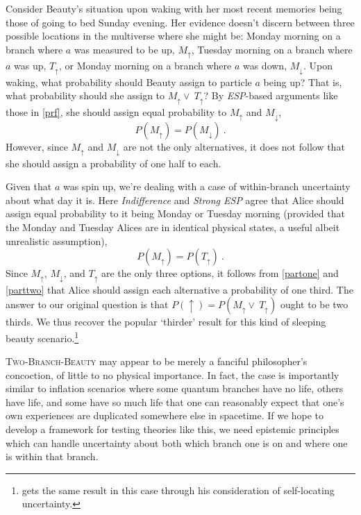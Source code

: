 \documentclass[12pt,onecolumn,secnumarabic,amsmath,amssymb,balancelastpage,nofootinbib]{article}
\begin{document}
Consider {Beauty's} situation upon waking with her most recent memories being those of going to bed Sunday evening. {Her} evidence doesn't discern between three possible locations in the multiverse where she might be: Monday morning on a branch where $a$ was measured to be up, $M_\uparrow $, Tuesday morning on a branch where $a$ was up, $T_\uparrow$, or Monday morning on a branch where $a$ was down, $M_\downarrow$.  Upon waking, what probability should Beauty assign to particle $a$ being up?  That is, what probability should she assign to $M_\uparrow \vee\: T_\uparrow$?  By \emph{ESP}-based arguments like those in \textsection \ref{prf}, she should assign equal probability to $M_\uparrow$ and $M_\downarrow$,
\begin{equation}
P\left(M_\uparrow\right)=P\left(M_\downarrow\right)\ .
\label{partone}
\end{equation}
However, since $M_\uparrow$ and $M_\downarrow$ are not the only alternatives, it does not follow that she should assign a probability of one half to each.

Given that $a$ was spin up, we're dealing with a case of within-branch uncertainty about what day it is.  Here \emph{Indifference} and \emph{Strong ESP} agree that Alice should assign equal probability to it being Monday or Tuesday morning (provided that the Monday and Tuesday Alices are in identical physical states, a useful albeit unrealistic assumption), 
\begin{equation}
P\left(M_\uparrow\right)=P\left(T_\uparrow\right)\ .
\label{parttwo}
\end{equation}
Since $M_\uparrow$, $M_\downarrow$, and $T_\uparrow$ are the only three options, it follows from \eqref{partone} and \eqref{parttwo} that Alice should assign each alternative a probability of one third.  The answer to our original question is that $P\left(\uparrow\right)=P\left(M_\uparrow \vee\: T_\uparrow\right)$ ought to be two thirds.  We thus recover the popular `thirder' result for this kind of sleeping beauty scenario.\footnote{\citet[]{vaidman2011} gets the same result in this case through his consideration of self-locating uncertainty.}

\textsc{Two-Branch-Beauty} may appear to be merely a fanciful philosopher's concoction, of little to no physical importance.  In fact, the case is importantly similar to inflation scenarios where some quantum branches have no life, others have life, and some have so much life that one can reasonably expect that one's own experiences are duplicated somewhere else in spacetime.  If we hope to develop a framework for testing theories like this, we need epistemic principles which can handle uncertainty about both which branch one is on and where one is within that branch.
\end{document}
